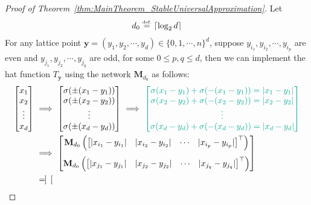 \documentclass{article}
\numberwithin{equation}{section}
\theoremstyle{definition}
\newcommand{\eqdef}{\ensuremath{\stackrel{\mbox{\upshape\tiny def.}}{=}}}
\begin{document}
\begin{proof}[{Proof of Theorem~\ref{thm:MainTheorem_StableUniversalApproximation}}]
Let 
$$d_0 \eqdef \lceil \log_2{d} \rceil$$
For any lattice point $\mathbf{y}=(y_1,y_2,\cdots,y_d)\in\{0,1,\cdots,n\}^d$, suppose $y_{i_1},y_{i_2},\cdots,y_{i_p}$ are even and $y_{j_1},y_{j_2},\cdots,y_{j_q}$ are odd, for some $0 \le p,q \le d$, then we can implement the hat function $T_{\mathbf{y}}$ using the network $\mathbf{M}_{d_0}$ as follows: 
\begin{align}
\label{eq:hat_network_structure}
    \begin{bmatrix} x_1 \\ x_2 \\ \vdots \\ x_d \end{bmatrix}
    \ &\Longrightarrow \
    \begin{bmatrix} \sigma(\pm(x_1-y_1)) \\ \sigma(\pm(x_2-y_2)) \\ \vdots \\ \sigma(\pm(x_d-y_d)) \end{bmatrix}
    \ \Longrightarrow \
    {\color{persiangreen}
    \begin{bmatrix} 
    \sigma(x_1 - y_1) + \sigma(-(x_1 - y_1)) = |x_1 - y_1|  \\ 
    \sigma(x_2 - y_2) + \sigma(-(x_2 - y_2)) = |x_2 - y_2|  \\ 
    \vdots  \\
    \sigma(x_d - y_d) + \sigma(-(x_d - y_d)) = |x_d - y_d|  \\
    \end{bmatrix}
    }
    \nonumber
    \\
    \ &\Longrightarrow \
    \begin{bmatrix} 
    \mathbf{M}_{d_0}\left(
        \begin{bmatrix}
            |x_{i_1} - y_{i_1}| & |x_{i_2} - y_{i_2}| & \cdots & |x_{i_p} - y_{i_p}|
        \end{bmatrix}^{\top}
    \right)  
    \nonumber
    \\ 
    \vspace{-5pt}  
    \nonumber
    \\
    \mathbf{M}_{d_0}\left(
        \begin{bmatrix}
            |x_{j_1} - y_{j_1}| & |x_{j_2} - y_{j_2}| & \cdots & |x_{j_q} - y_{j_q}|
        \end{bmatrix}^{\top}
    \right)
    \end{bmatrix}  \\
    \ &= \ 
    \begin{bmatrix} 

\end{bmatrix}
\end{align}
\end{proof}
\end{document}
